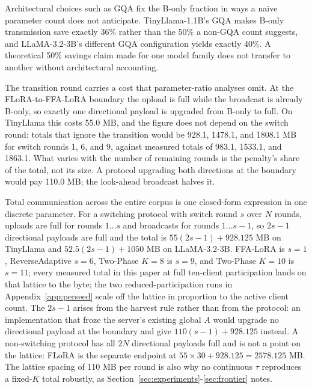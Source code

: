 Architectural choices such as GQA fix the B-only fraction in ways a naive parameter count does not anticipate. TinyLlama-1.1B's GQA makes B-only transmission save exactly 36\% rather than the 50\% a non-GQA count suggests, and LLaMA-3.2-3B's different GQA configuration yields exactly 40\%. A theoretical 50\% savings claim made for one model family does not transfer to another without architectural accounting.

The transition round carries a cost that parameter-ratio analyses omit. At the FLoRA-to-FFA-LoRA boundary the upload is full while the broadcast is already B-only, so exactly one directional payload is upgraded from B-only to full. On TinyLlama this costs 55.0 MB, and the figure does not depend on the switch round: totals that ignore the transition would be 928.1, 1478.1, and 1808.1 MB for switch rounds 1, 6, and 9, against measured totals of 983.1, 1533.1, and 1863.1. What varies with the number of remaining rounds is the penalty's share of the total, not its size. A protocol upgrading both directions at the boundary would pay 110.0 MB; the look-ahead broadcast halves it.

Total communication across the entire corpus is one closed-form expression in one discrete parameter. For a switching protocol with switch round $s$ over $N$ rounds, uploads are full for rounds $1 \ldots s$ and broadcasts for rounds $1 \ldots s{-}1$, so $2s-1$ directional payloads are full and the total is $55(2s-1) + 928.125$ MB on TinyLlama and $52.5(2s-1) + 1050$ MB on LLaMA-3.2-3B. FFA-LoRA is $s{=}1$, ReverseAdaptive $s{=}6$, Two-Phase $K{=}8$ is $s{=}9$, and Two-Phase $K{=}10$ is $s{=}11$; every measured total in this paper at full ten-client participation lands on that lattice to the byte; the two reduced-participation runs in Appendix~\ref{app:perseed} scale off the lattice in proportion to the active client count. The $2s-1$ arises from the harvest rule rather than from the protocol: an implementation that froze the server's existing global $A$ would upgrade no directional payload at the boundary and give $110(s-1) + 928.125$ instead. A non-switching protocol has all $2N$ directional payloads full and is not a point on the lattice: FLoRA is the separate endpoint at $55 \times 30 + 928.125 = 2578.125$ MB. The lattice spacing of 110 MB per round is also why no continuous $\tau$ reproduces a fixed-$K$ total robustly, as Section~\ref{sec:experiments}-\ref{sec:frontier} notes.

